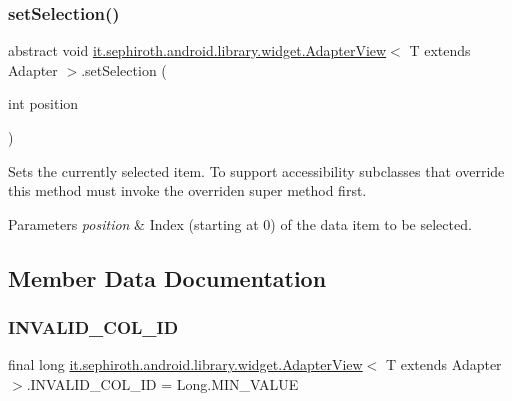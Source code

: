 \subsubsection{\texorpdfstring{set\+Selection()}{setSelection()}}
{\footnotesize\ttfamily abstract void \hyperlink{classit_1_1sephiroth_1_1android_1_1library_1_1widget_1_1_adapter_view}{it.\+sephiroth.\+android.\+library.\+widget.\+Adapter\+View}$<$ T extends Adapter $>$.set\+Selection (\begin{DoxyParamCaption}\item[{int}]{position }\end{DoxyParamCaption})\hspace{0.3cm}{\ttfamily [abstract]}}

Sets the currently selected item. To support accessibility subclasses that override this method must invoke the overriden super method first.


\begin{DoxyParams}{Parameters}
{\em position} & Index (starting at 0) of the data item to be selected. \\
\hline
\end{DoxyParams}


\subsection{Member Data Documentation}
\mbox{\label{classit_1_1sephiroth_1_1android_1_1library_1_1widget_1_1_adapter_view_a4652ef84c3de9de7d3697a29e2bb96c6}} 
\subsubsection{\texorpdfstring{I\+N\+V\+A\+L\+I\+D\+\_\+\+C\+O\+L\+\_\+\+ID}{INVALID\_COL\_ID}}
{\footnotesize\ttfamily final long \hyperlink{classit_1_1sephiroth_1_1android_1_1library_1_1widget_1_1_adapter_view}{it.\+sephiroth.\+android.\+library.\+widget.\+Adapter\+View}$<$ T extends Adapter $>$.I\+N\+V\+A\+L\+I\+D\+\_\+\+C\+O\+L\+\_\+\+ID = Long.\+M\+I\+N\+\_\+\+V\+A\+L\+UE\hspace{0.3cm}{\ttfamily [static]}}

